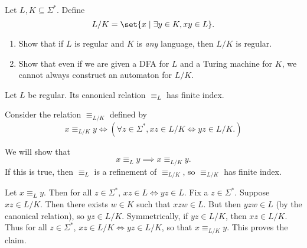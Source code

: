 \documentclass[12pt]{article}
\begin{document}
\begin{problem*}
    Let $L, K \subseteq \Sigma^*$.
    Define \[
        L / K = \set{x \mid \exists y \in K, xy \in L}.
    \]
    \begin{enumerate}[label=(\alph*)]
        \item Show that if $L$ is regular and $K$ is \emph{any} language,
            then $L / K$ is regular.
        \item Show that even if we are given a DFA for $L$ and a Turing
            machine for $K$, we cannot always construct an automaton for
            $L / K$.
    \end{enumerate}
\end{problem*}
\begin{solution}
    Let $L$ be regular.
    Its canonical relation $\equiv_L$ has finite index.

    Consider the relation $\equiv_{L / K}$ defined by \[
        x \equiv_{L/K} y \iff (\forall z \in \Sigma^*, xz \in L/K \iff yz \in L/K.)
    \]

    We will show that \[
        x \equiv_L y \implies x \equiv_{L/K} y.
    \] If this is true, then $\equiv_L$ is a refinement of $\equiv_{L/K}$,
    so $\equiv_{L/K}$ has finite index.

    Let $x \equiv_L y$.
    Then for all $z \in \Sigma^*$, $xz \in L \iff yz \in L$.
    Fix a $z \in \Sigma^*$.
    Suppose $xz \in L/K$.
    Then there exists $w \in K$ such that $xzw \in L$.
    But then $yzw \in L$ (by the canonical relation), so $yz \in L/K$.
    Symmetrically, if $yz \in L/K$, then $xz \in L/K$.
    Thus for all $z \in \Sigma^*$, $xz \in L/K \iff yz \in L/K$,
    so that $x \equiv_{L/K} y$.
    This proves the claim.
\end{solution}
\end{document}
